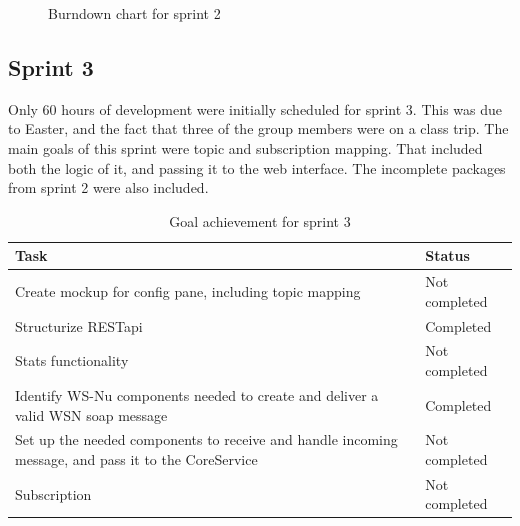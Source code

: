 \begin{center}
  \begin{figure}[ht!]
    \caption{Burndown chart for sprint 2}
    \label{fig:sprint 2, burndown}
  \end{figure}
\end{center}


\subsection{Sprint 3}
\label{subsec:project_lifecycle-development-sprint_3}

Only 60 hours of development were initially scheduled for sprint 3. This was due to Easter, and the fact that three of the group members were on a class trip. The main goals of this sprint were topic and subscription mapping. That included both the logic of it, and passing it to the web interface. The incomplete packages from sprint 2 were also included.

\clearpage

\begin{table}[t]
\small
\centering
\begin{tabular}{ | p{10cm} | p{2cm} |}
\hline
\rowcolor{lightgray}
 \textbf{Task} & \textbf{Status} \\
\hline
\rowcolor{orange!40}
Create mockup for config pane, including topic mapping & Not completed \\
\rowcolor{green!30}
Structurize RESTapi & Completed \\
\rowcolor{orange!40}
Stats functionality & Not completed \\
\rowcolor{green!30}
Identify WS-Nu components needed to create and deliver a valid WSN soap message & Completed \\
\rowcolor{orange!40}
Set up the needed components to receive and handle incoming message, and pass it to the CoreService & Not completed \\
\rowcolor{orange!40}
Subscription & Not completed \\
\hline
\end{tabular}
\caption{Goal achievement for sprint 3}
\label{tab:sprint 3, goals}
\end{table}

